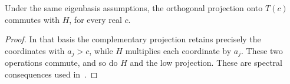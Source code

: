 \begin{theorem}
    \label{thm:spectral_span_projection_commutes}
    \leanok
    Under the same eigenbasis assumptions, the orthogonal projection
    onto $T(c)$ commutes with $H$, for every real $c$.
\end{theorem}
\begin{proof}
    \leanok
    In that basis the complementary projection retains precisely the
    coordinates with $a_j>c$, while $H$ multiplies each coordinate by $a_j$.
    These two operations commute, and so do $H$ and the low projection.
    These are spectral consequences used
    in~\cite[lines 955--968 and 1010--1024]{Arad2016RigorousRG}.
\end{proof}

